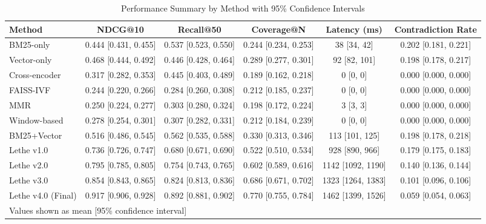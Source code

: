 \begin{table*}[htbp]
\centering
\caption{Performance Summary by Method with 95\% Confidence Intervals}
\label{tab:enhanced-performance-summary}
\begin{tabular}{lccccc}
\toprule
Method & NDCG@10 & Recall@50 & Coverage@N & Latency (ms) & Contradiction Rate \\
\midrule
BM25-only & 0.444 [0.431, 0.455] & 0.537 [0.523, 0.550] & 0.244 [0.234, 0.253] & 38 [34, 42] & 0.202 [0.181, 0.221] \\
Vector-only & 0.468 [0.444, 0.492] & 0.446 [0.428, 0.464] & 0.289 [0.277, 0.301] & 92 [82, 101] & 0.198 [0.178, 0.217] \\
Cross-encoder & 0.317 [0.282, 0.353] & 0.445 [0.403, 0.489] & 0.189 [0.162, 0.218] & 0 [0, 0] & 0.000 [0.000, 0.000] \\
FAISS-IVF & 0.244 [0.220, 0.266] & 0.284 [0.260, 0.308] & 0.212 [0.185, 0.237] & 0 [0, 0] & 0.000 [0.000, 0.000] \\
MMR & 0.250 [0.224, 0.277] & 0.303 [0.280, 0.324] & 0.198 [0.172, 0.224] & 3 [3, 3] & 0.000 [0.000, 0.000] \\
Window-based & 0.278 [0.254, 0.301] & 0.307 [0.282, 0.331] & 0.212 [0.184, 0.239] & 0 [0, 0] & 0.000 [0.000, 0.000] \\
BM25+Vector & 0.516 [0.486, 0.545] & 0.562 [0.535, 0.588] & 0.330 [0.313, 0.346] & 113 [101, 125] & 0.198 [0.178, 0.218] \\
Lethe v1.0 & 0.736 [0.726, 0.747] & 0.680 [0.671, 0.690] & 0.522 [0.510, 0.534] & 928 [890, 966] & 0.179 [0.175, 0.183] \\
Lethe v2.0 & 0.795 [0.785, 0.805] & 0.754 [0.743, 0.765] & 0.602 [0.589, 0.616] & 1142 [1092, 1190] & 0.140 [0.136, 0.144] \\
Lethe v3.0 & 0.854 [0.843, 0.865] & 0.824 [0.813, 0.836] & 0.686 [0.671, 0.702] & 1323 [1264, 1383] & 0.101 [0.096, 0.106] \\
Lethe v4.0 (Final) & 0.917 [0.906, 0.928] & 0.892 [0.881, 0.902] & 0.770 [0.755, 0.784] & 1462 [1399, 1526] & 0.059 [0.054, 0.063] \\
\bottomrule
\multicolumn{6}{l}{\small Values shown as mean [95\% confidence interval]} \\
\end{tabular}
\end{table*}
